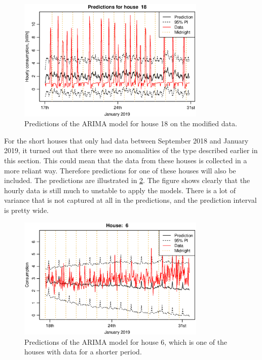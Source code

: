 \begin{figure}
    \centering
    \includegraphics[width=0.8\textwidth]{../../../figures/arimax/arima2_pred_18.eps}
    \caption{Predictions of the ARIMA model for house 18 on the modified data.}
    \label{fig:arima1_pred_18}
\end{figure}


\noindent For the short houses that only had data between September 2018 and January 2019, it turned out that there were no anomalities of the type described earlier in this section. This could mean that the data from these houses is collected in a more reliant way. Therefore predictions for one of these houses will also be included. The predictions are illustrated in \cref{fig:arima1_pred_6}. The figure shows clearly that the hourly data is still much to unstable to apply the models. There is a lot of variance that is not captured at all in the predictions, and the prediction interval is pretty wide.


\begin{figure}
    \centering
    \includegraphics[width=0.8\textwidth]{../../../figures/Pred14days6.eps}
    \caption{Predictions of the ARIMA model for house 6, which is one of the houses with data for a shorter period.}
    \label{fig:arima1_pred_6}
\end{figure}



